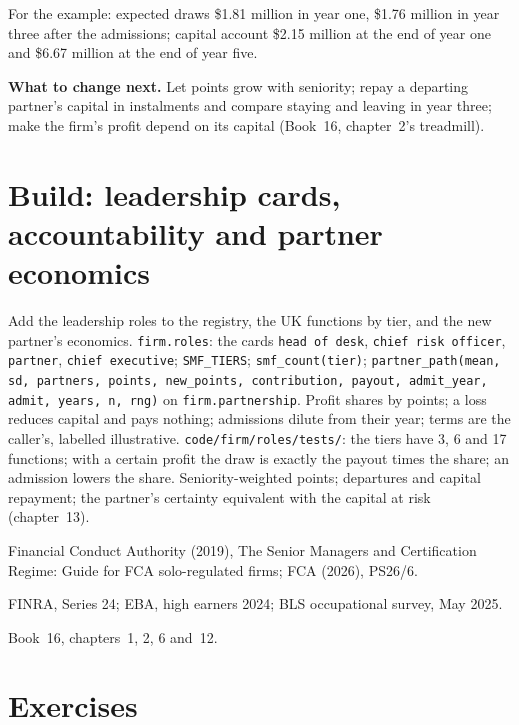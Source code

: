For the example: expected draws \$1.81 million in year one, \$1.76 million in year three after the admissions; capital
account \$2.15 million at the end of year one and \$6.67 million at the end of year five.

\textbf{What to change next.} Let points grow with seniority; repay a departing partner's capital in instalments and
compare staying and leaving in year three; make the firm's profit depend on its capital (Book~16, chapter~2's
treadmill).

\section{Build: leadership cards, accountability and partner economics}\label{bld:in:leadership-roles:roles}

\begin{build}
 Add the leadership roles to the registry, the UK functions by tier, and the new partner's economics.
 \texttt{firm.roles}: the cards \texttt{head of desk}, \texttt{chief risk officer}, \texttt{partner},
\texttt{chief executive}; \texttt{SMF\_TIERS}; \texttt{smf\_count(tier)}; \texttt{partner\_path(mean, sd, partners,
points, new\_points, contribution, payout, admit\_year, admit, years, n, rng)} on \texttt{firm.partnership}.
 Profit shares by points; a loss reduces capital and pays nothing; admissions dilute from their year; terms
are the caller's, labelled illustrative.
 \texttt{code/firm/roles/tests/}: the tiers have 3, 6 and 17 functions; with a certain profit
the draw is exactly the payout times the share; an admission lowers the share.
 Seniority-weighted points; departures and capital repayment; the partner's certainty equivalent with
the capital at risk (chapter~13).
\end{build}

\begin{omsources}
\item Financial Conduct Authority (2019), The Senior Managers and Certification Regime: Guide for FCA solo-regulated
firms; FCA (2026), PS26/6.
\item FINRA, Series 24; EBA, high earners 2024; BLS occupational survey, May 2025.
\item Book~16, chapters~1, 2, 6 and~12.
\end{omsources}

\section{Exercises}

